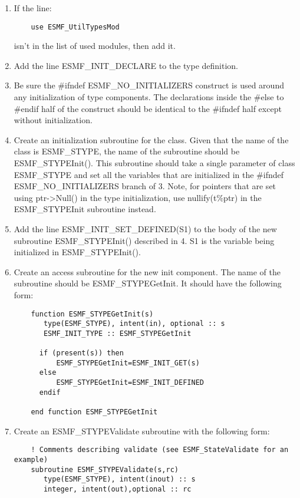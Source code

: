 \begin{enumerate}
\item If the line:
\begin{verbatim}
    use ESMF_UtilTypesMod 
\end{verbatim}
  isn't in the list of used modules, then add it.  

\item Add the line ESMF\_INIT\_DECLARE to the type definition.
\item Be sure the \#ifndef ESMF\_NO\_INITIALIZERS construct is
    used around any initialization of type components. 
    The declarations inside the \#else to \#endif half of the construct
    should be identical to the \#ifndef half except without initialization.
\item Create an initialization subroutine for the class.
    Given that the name of the class is ESMF\_STYPE,
    the name of the subroutine should be ESMF\_STYPEInit().
    This subroutine should take a single parameter of class
    ESMF\_STYPE and set all the variables that are
    initialized in the \#ifndef ESMF\_NO\_INITIALIZERS branch
    of 3. Note, for pointers that are set using ptr->Null()
    in the type initialization, use nullify(t\%ptr) in the 
    ESMF\_STYPEInit subroutine instead. 
\item Add the line ESMF\_INIT\_SET\_DEFINED(S1) to the body of
    the new subroutine ESMF\_STYPEInit() described in 4.
     S1 is the variable being initialized in ESMF\_STYPEInit().
\item Create an access subroutine for the new init component.
    The name of the subroutine should be ESMF\_STYPEGetInit.
    It should have the following form:

\begin{verbatim}
    function ESMF_STYPEGetInit(s)
       type(ESMF_STYPE), intent(in), optional :: s
       ESMF_INIT_TYPE :: ESMF_STYPEGetInit

      if (present(s)) then
          ESMF_STYPEGetInit=ESMF_INIT_GET(s)
      else
          ESMF_STYPEGetInit=ESMF_INIT_DEFINED
      endif

    end function ESMF_STYPEGetInit
\end{verbatim}

\item Create an ESMF\_STYPEValidate subroutine with the following form:

\begin{verbatim}
    ! Comments describing validate (see ESMF_StateValidate for an example)
    subroutine ESMF_STYPEValidate(s,rc)
       type(ESMF_STYPE), intent(inout) :: s
       integer, intent(out),optional :: rc


\end{verbatim}
\end{enumerate}
